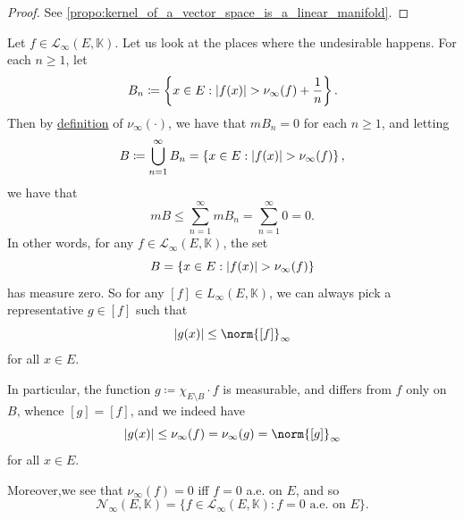 \documentclass[notoc,notitlepage]{tufte-book}
\begin{document}
\begin{proof}
  See \cref{propo:kernel_of_a_vector_space_is_a_linear_manifold}.
\end{proof}

\begin{remark}\label{remark:cursivel_infty_supremeness_of_the_essential_sup}
  Let $f \in \mathcal{L}_\infty(E, \mathbb{K})$.
  Let us look at the places where the undesirable happens.
  For each $n \geq 1$, let
  \begin{equation*}
    B_n \coloneqq \left\{ x \in E :
      \left|f(x)\right| > \nu_{\infty} (f) + \frac{1}{n} \right\}.
  \end{equation*}
  Then by \hyperref[defn:essential_supremum]{definition} of $\nu_\infty(\cdot)$,
  we have that $mB_n = 0$ for each $n \geq 1$,
  and letting
  \begin{equation*}
    B \coloneqq \bigcup_{n=1}^{\infty} B_n = \left\{ x \in E : \left|f(x)\right| >
    \nu_\infty(f) \right\},
  \end{equation*}
  we have that
  \begin{equation*}
    mB \leq \sum_{n=1}^{\infty} mB_n = \sum_{n=1}^{\infty} 0 = 0.
  \end{equation*}
  In other words, for any $f \in \mathcal{L}_\infty(E, \mathbb{K})$, the set
  \begin{equation*}
    B = \left\{ x \in E : \left|f(x)\right| > \nu_\infty(f) \right\}
  \end{equation*}
  has measure zero. So for any $[f] \in L_\infty(E, \mathbb{K})$,
  we can always pick a representative $g \in [f]$ such that
  \begin{equation*}
    \abs{g(x)} \leq \norm{[f]}_\infty
  \end{equation*}
  for all $x \in E$.

  In particular, the function $g \coloneqq \chi_{E \setminus B} \cdot f$
  is measurable, and differs from $f$ only on $B$, whence $[g] = [f]$,
  and we indeed have
  \begin{equation*}
    \abs{g(x)} \leq \nu_{\infty}(f) = \nu_{\infty}(g) = \norm{[g]}_{\infty}
  \end{equation*}
  for all $x \in E$.

  Moreover,we see that $\nu_{\infty}(f) = 0$ iff $f = 0$ a.e. on $E$,
  and so
  \begin{equation*}
    \mathcal{N}_{\infty}(E, \mathbb{K}) =
    \{ f \in \mathcal{L}_{\infty}(E, \mathbb{K}) : f = 0 \text{ a.e. on } E \}.
  \end{equation*}
\end{remark}
\end{document}
